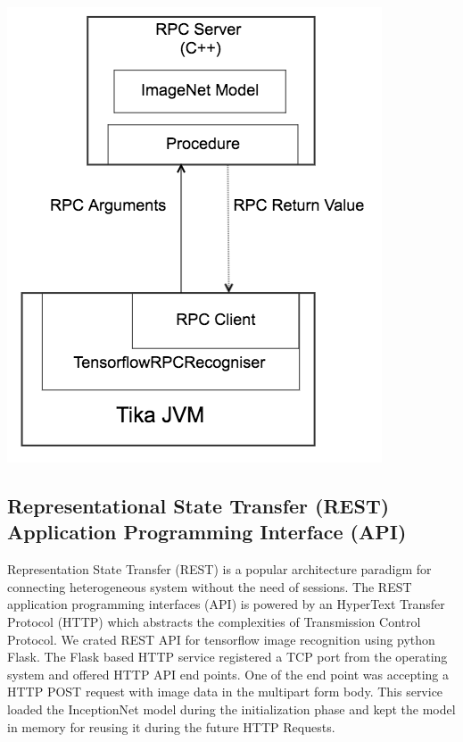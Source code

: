 \documentclass[letterpaper, 10 pt, conference]{ieeeconf}  %
\begin{document}
\includegraphics[scale=0.40]{tika-tflow-RPC-design}

\subsection{Representational State Transfer (REST) Application Programming Interface (API)} \label{sec:int-rest}
Representation State Transfer (REST) is a popular architecture paradigm for connecting heterogeneous system without the need of sessions\cite{}. The REST application programming interfaces (API) is powered by an HyperText Transfer Protocol (HTTP) which abstracts the complexities of Transmission Control Protocol.
We crated REST API for tensorflow image recognition using python Flask\cite{}. The Flask based HTTP service registered a TCP port from the operating system and offered HTTP API end points.
One of the end point was accepting a HTTP POST request with image data in the multipart form \cite{} body. This service loaded the InceptionNet \cite{} model during the initialization phase and kept the model in memory for reusing it during the future HTTP Requests. 
\end{document}
